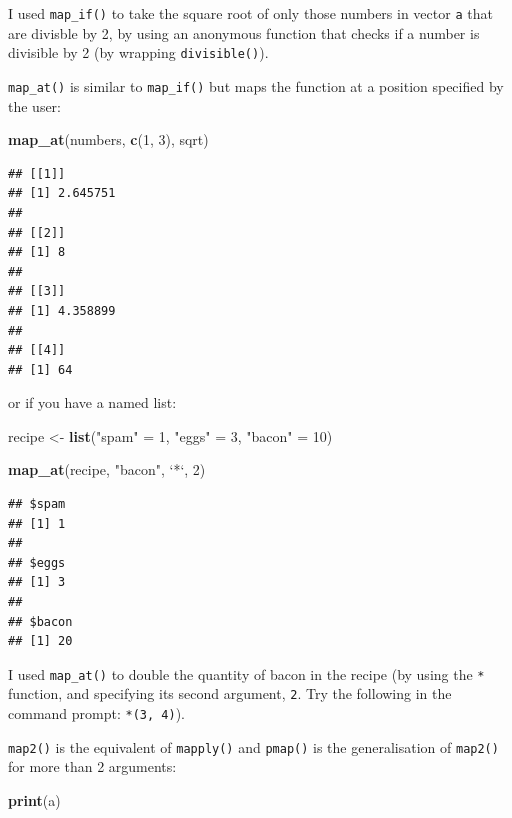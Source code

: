 \documentclass[]{gitbook}
\newenvironment{Shaded}{\begin{snugshade}}{\end{snugshade}}
\newcommand{\DataTypeTok}[1]{\textcolor[rgb]{0.13,0.29,0.53}{#1}}
\newcommand{\DecValTok}[1]{\textcolor[rgb]{0.00,0.00,0.81}{#1}}
\newcommand{\KeywordTok}[1]{\textcolor[rgb]{0.13,0.29,0.53}{\textbf{#1}}}
\newcommand{\NormalTok}[1]{#1}
\newcommand{\StringTok}[1]{\textcolor[rgb]{0.31,0.60,0.02}{#1}}
\begin{document}
I used \texttt{map\_if()} to take the square root of only those numbers in vector \texttt{a} that are divisble by 2,
by using an anonymous function that checks if a number is divisible by 2 (by wrapping \texttt{divisible()}).

\texttt{map\_at()} is similar to \texttt{map\_if()} but maps the function at a position specified by the user:

\begin{Shaded}
\begin{Highlighting}[]
\KeywordTok{map_at}\NormalTok{(numbers, }\KeywordTok{c}\NormalTok{(}\DecValTok{1}\NormalTok{, }\DecValTok{3}\NormalTok{), sqrt)}
\end{Highlighting}
\end{Shaded}

\begin{verbatim}
## [[1]]
## [1] 2.645751
## 
## [[2]]
## [1] 8
## 
## [[3]]
## [1] 4.358899
## 
## [[4]]
## [1] 64
\end{verbatim}

or if you have a named list:

\begin{Shaded}
\begin{Highlighting}[]
\NormalTok{recipe <-}\StringTok{ }\KeywordTok{list}\NormalTok{(}\StringTok{"spam"}\NormalTok{ =}\StringTok{ }\DecValTok{1}\NormalTok{, }\StringTok{"eggs"}\NormalTok{ =}\StringTok{ }\DecValTok{3}\NormalTok{, }\StringTok{"bacon"}\NormalTok{ =}\StringTok{ }\DecValTok{10}\NormalTok{)}

\KeywordTok{map_at}\NormalTok{(recipe, }\StringTok{"bacon"}\NormalTok{, }\StringTok{`}\DataTypeTok{*}\StringTok{`}\NormalTok{, }\DecValTok{2}\NormalTok{)}
\end{Highlighting}
\end{Shaded}

\begin{verbatim}
## $spam
## [1] 1
## 
## $eggs
## [1] 3
## 
## $bacon
## [1] 20
\end{verbatim}

I used \texttt{map\_at()} to double the quantity of bacon in the recipe (by using the \texttt{*} function, and specifying
its second argument, \texttt{2}. Try the following in the command prompt: \texttt{\textasciigrave{}*\textasciigrave{}(3,\ 4)}).

\texttt{map2()} is the equivalent of \texttt{mapply()} and \texttt{pmap()} is the generalisation of \texttt{map2()} for more
than 2 arguments:

\begin{Shaded}
\begin{Highlighting}[]
\KeywordTok{print}\NormalTok{(a)}
\end{Highlighting}
\end{Shaded}
\end{document}
